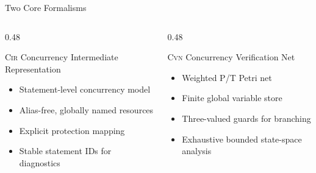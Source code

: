 \documentclass[aspectratio=169]{beamer}
\newcommand{\Cir}{\textsc{Cir}}
\newcommand{\Cvn}{\textsc{Cvn}}
\begin{document}
\begin{frame}{Two Core Formalisms}
  \begin{columns}[T]
    \begin{column}{0.48\textwidth}
      \begin{block}{\Cir}
        Concurrency Intermediate Representation
      \end{block}
      \begin{itemize}
        \item Statement-level concurrency model
        \item Alias-free, globally named resources
        \item Explicit protection mapping
        \item Stable statement IDs for diagnostics
      \end{itemize}
    \end{column}
    \begin{column}{0.48\textwidth}
      \begin{block}{\Cvn}
        Concurrency Verification Net
      \end{block}
      \begin{itemize}
        \item Weighted P/T Petri net
        \item Finite global variable store
        \item Three-valued guards for branching
        \item Exhaustive bounded state-space analysis
      \end{itemize}
    \end{column}
  \end{columns}
\end{frame}
\end{document}
